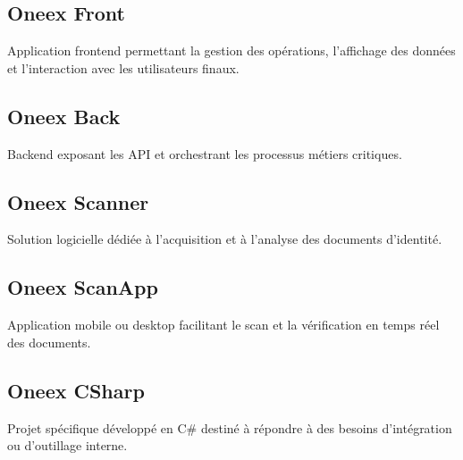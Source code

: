 \subsection{Oneex Front}

Application frontend permettant la gestion des opérations, l’affichage des données et l’interaction avec les utilisateurs finaux.

\subsection{Oneex Back}

Backend exposant les API et orchestrant les processus métiers critiques.

\subsection{Oneex Scanner}

Solution logicielle dédiée à l’acquisition et à l’analyse des documents d’identité.

\subsection{Oneex ScanApp}

Application mobile ou desktop facilitant le scan et la vérification en temps réel des documents.

\subsection{Oneex CSharp}

Projet spécifique développé en C\# destiné à répondre à des besoins d’intégration ou d’outillage interne.

